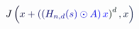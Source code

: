 \documentclass[12pt]{article}
\begin{document}
\makeatletter
\renewcommand*{\@textcolor}[3]{%
  \protect\leavevmode
  \begingroup
    \color#1{#2}#3%
  \endgroup
}
\makeatother
\begin{displaymath}
\mathcolor[RGB]{0,0,15}{J} \mathcolor[RGB]{0,0,30}{\left(} \mathcolor[RGB]{0,0,45}{x} \mathcolor[RGB]{0,0,60}{+} \mathcolor[RGB]{0,0,75}{\left(} \mathcolor[RGB]{0,0,90}{\left(} \mathcolor[RGB]{0,0,105}{H} _ { \mathcolor[RGB]{0,0,120}{n} \mathcolor[RGB]{0,0,135}{,} \mathcolor[RGB]{0,0,150}{d} } \mathcolor[RGB]{0,0,165}{(} \mathcolor[RGB]{0,0,180}{s} \mathcolor[RGB]{0,0,195}{)} \mathcolor[RGB]{0,0,210}{\odot} \mathcolor[RGB]{0,0,225}{A} \mathcolor[RGB]{0,0,240}{\right)} \mathcolor[RGB]{0,0,255}{x} \mathcolor[RGB]{0,15,0}{\right)} ^ { \mathcolor[RGB]{0,15,15}{d} } \mathcolor[RGB]{0,15,30}{,} \mathcolor[RGB]{0,15,45}{x} \mathcolor[RGB]{0,15,60}{\right)}
\end{displaymath}
\end{document}
